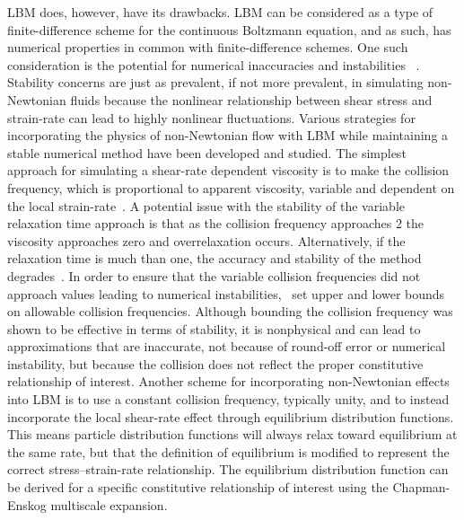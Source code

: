 LBM does, however, have its drawbacks.
LBM can be considered as a type of finite-difference scheme for the continuous Boltzmann equation, and as such, has numerical properties in common with finite-difference schemes.
One such consideration is the potential for numerical inaccuracies and instabilities ~\cite{sterling1993stability,sterling1996stability,bawazeer2013stability,lallemand2000theory}.
Stability concerns are just as prevalent, if not more prevalent, in simulating non-Newtonian fluids because the nonlinear relationship between shear stress and strain-rate can lead to highly nonlinear fluctuations.
Various strategies for incorporating the physics of non-Newtonian flow with LBM while maintaining a stable numerical method have been developed and studied.
The simplest approach for simulating a shear-rate dependent viscosity is to make the collision frequency, which is proportional to apparent viscosity, variable and dependent on the local strain-rate~\cite{boyd2006second,chen2014simulations,fallah2012multiple,tang2011bingham,svec2011flow,svec2012free,zhao2016lattice}.
A potential issue with the stability of the variable relaxation time approach is that as the collision frequency approaches $2$ the viscosity approaches zero and overrelaxation occurs.
Alternatively, if the relaxation time is much \DIFdelbegin {}\DIFdelend \DIFaddbegin {}\DIFaddend than one, the accuracy and stability of the method degrades~\cite{latt2007hydrodynamic}. 
In order to ensure that the variable collision frequencies did not approach values leading to numerical instabilities,~\cite{svec2011flow,svec2012free,gabbanelli2005lattice} set upper and lower bounds on allowable collision frequencies.
Although bounding the collision frequency was shown to be effective in terms of stability, it is nonphysical and can lead to approximations that are inaccurate, not because of round-off error or numerical instability, but because the collision does not reflect the proper constitutive relationship of interest.
Another scheme for incorporating non-Newtonian effects into LBM is to use a constant collision frequency, typically unity, and to instead incorporate the local shear-rate effect through equilibrium distribution functions.
This means particle distribution functions will always relax toward equilibrium at the same rate, but that the definition of equilibrium is modified to represent the correct stress--strain-rate relationship.
The equilibrium distribution function can be derived for a specific constitutive relationship of interest using the Chapman-Enskog multiscale expansion.
